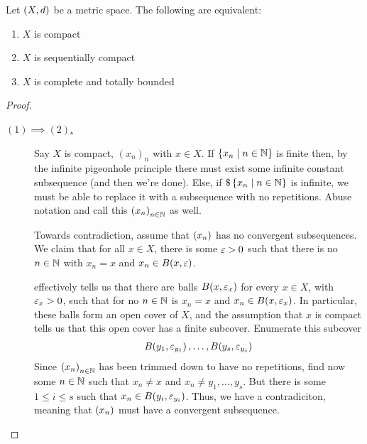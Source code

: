 \begin{boxtheorem}\label{Ch1:Thm:compact_seq_compact_TFAE}
    Let $\left( X, d \right)$ be a metric space. The following are equivalent:
    \begin{enumerate}[label = (\arabic*)]
        \item $X$ is compact
        \item $X$ is sequentially compact
        \item $X$ is complete and totally bounded
    \end{enumerate}
\end{boxtheorem}
\begin{proof}
    \begin{description}
        \item[\underline{$(1) \implies (2)$.}] Say $X$ is compact, $(x_n)_n$ with $x\in X$. If $\left\{ x_n \; \middle\vert \; n \in \mathbb{N} \right\}$ is finite then, by the infinite pigeonhole principle there must exist some infinite constant  subsequence (and then we're done). Else, if $\$\left\{ x_n \; \middle\vert \; n \in \mathbb{N} \right\}$ is infinite, we must be able to replace it with a subsequence with no repetitions. Abuse notation and call this $\left( x_n \right)_{n \in \mathbb{N}}$ as well.

        Towards contradiction, assume that $\left( x_n \right)$ has no convergent subsequences. We claim that for all $x \in X$, there is some $\varepsilon > 0$ such that there is no $n \in \mathbb{N}$ with $x_n = x$ and $x_n \in B\!\left( x, \varepsilon \right)$.
        
         effectively tells us that there are balls $B\!\left( x, \varepsilon_x \right)$ for every $x \in X$, with $\varepsilon_x > 0$, such that for no $n \in \mathbb{N}$ is $x_n = x$ and $x_n \in B\!\left( x, \varepsilon_x \right)$. In particular, these balls form an open cover of $X$, and the assumption that $x$ is compact tells us that this open cover has a finite subcover. Enumerate this subcover
        \begin{align*}
            B\!\left( y_1, \varepsilon_{y_1} \right), \ldots, B\!\left( y_s, \varepsilon_{y_s} \right)
        \end{align*}
        Since $\left( x_n \right)_{n \in \mathbb{N}}$ has been trimmed down to have no repetitions, find now some $n \in \mathbb{N}$ such that $x_n \neq x$ and $x_n \neq y_1, \ldots, y_s$. But there is some $1 \leq i \leq s$ such that $x_n \in B\!\left( y_i, \varepsilon_{y_i} \right)$. Thus, we have a contradiciton, meaning that $\left( x_n \right)$ must have a convergent subsequence.


\end{description}
\end{proof}
